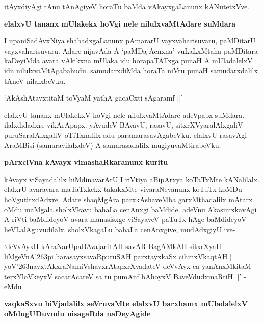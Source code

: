 \noindent
itAyxdiyAgi tAnu tAnAgiyeV horaTu baMda vAkayxgaLanunx kANutetxVve.

{\bigskip
\noindent
{\large\bf elalxvU tananx mUlakekx hoVgi nele nilulxvaMtAdare suMdara}}\label{page246}
\medskip

\noindent
I upaniSadAvxNiya shabadxgaLanunx pAmararU vayxvaharisuvaru, paMDitarU vayxvaharisuvaru. Adare nijavAda A `paMDajAcnxna' vuLaLxMtaha paMDitara kaDeyiMda avara vAkikxna mUlaka idu horapaTATxga punaH A mUladalelxV idu nilulxvaMtAgabahudu. samudarxdiMda horaTa niVru punaH samudarxdalilx tAneV nilalxbeVku.

\begin{shloka}
`AkAshAtavxtitaM toVyaM yathA gacaCxti sAgaramf ||'\label{247}
\end{shloka}

elalxvU tananx mUlakekxV hoVgi nele nilulxvaMtAdare adeVpapx suMdara. ilalxdidadxre vikArApapx. yAvu\-deV BAvavU, rasavU, sitxrXVyaralAlxgaliV puruSaralAlxgaliV oTiTxnalilx adu paramarasavAgabeVku. elalxvU rasa\-vAgi AraMBisi (samaravilalxdeV) A samarasadalilx mugiyuvaMtirabeVku.

{\medskip
\noindent
{\large\bf pArxciVna kAvayx vimashaRkaranunx kuritu}}
\smallskip

\noindent
kAvayx viSayadalilx hiMdinavarArU I riVtiya aBipArxya koTaTxMte kANalilalx. elalxrU avaravara maTaTxkekx takakxMte vivaraNeyanunx koTuTx koMDu hoVgutitxdAdxre. Adare shaqMgAra parxkAshaveMba garxMthadalilx mAtarx oMdu maMgala sholxVkavu bahaLa cenAnxgi baMdide. adeVnu AkasimxkavAgi A riVti baMdideyoV avara manasisxge viSayaveV paTuTx hAge baMdideyoV heVLalAguvudilalx. sholxVkagaLu bahaLa cenAnxgive, mudAdxgiyU ive-

\begin{shloka}
`deVvAyxH kAraNarUpaBAvajanitAH savAR BagAMkAH sitxrXyaH\\\label{247}
liMgeVnA\char'263pi harasayxsavaRpuruSAH parxtayxkaSx cihinxVkaqtAH |\\
yoV\char'263nayxtAkxraNamiVshavxrAtapxrXvadateV deVvAyx ca yanAnxMkitaM \\
terxYloVkeyxV sacarAcareV sa tu pumAnf bAhoyxV BaveVdudxmaRtiH ||' - eMdu
\end{shloka}

{\bigskip
\noindent
{\large\bf vaqkaSxvu biVjadalilx seVruvaMte elalxvU barxhamx mUladalelxV oMdugUDuvudu nisagaRda naDeyAgide}}\label{page247}
\medskip

